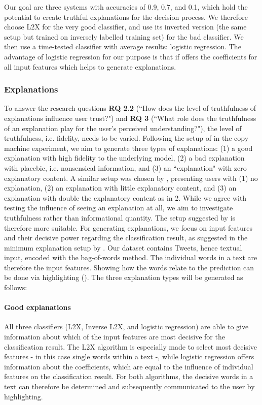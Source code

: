 Our goal are three systems with accuracies of 0.9, 0.7, and 0.1, which hold the potential to create truthful explanations for the decision process. We therefore choose L2X for the very good classifier, and use its inverted version (the same setup but trained on inversely labelled training set) for the bad classifier. We then use a time-tested classifier with average results: logistic regression. The advantage of logistic regression for our purpose is that if offers the coefficients for all input features which helps to generate explanations. 

\subsubsection{Explanations}
\label{subsubsec:method_explanations}
To answer the research questions \textbf{RQ 2.2} (``How does the level of truthfulness of explanations influence user trust?") and \textbf{RQ 3} (``What role does the truthfulness of an explanation play for the user's perceived understanding?"), the level of truthfulness, i.e. fidelity, needs to be varied. Following the setup of \cite{langer1978mindlessness} in the copy machine experiment, we aim to generate three types of explanations: (1) a good explanation with high fidelity to the underlying model, (2) a bad explanation with placebic, i.e. nonsensical information, and (3) an ``explanation" with zero explanatory content. A similar setup was chosen by \cite{ribeiro2018anchors}, presenting users with (1) no explanation, (2) an explanation with little explanatory content, and (3) an explanation with double the explanatory content as in 2. While we agree with testing the influence of seeing an explanation at all, we aim to investigate truthfulness rather than informational quantity. The setup suggested by \cite{langer1978mindlessness} is therefore more suitable.\newline
For generating explanations, we focus on input features and their decisive power regarding the classification result, as suggested in the minimum explanation setup by \cite{goodman16eu}. Our dataset contains Tweets, hence textual input, encoded with the bag-of-words method. The individual words in a text are therefore the input features. Showing how the words relate to the prediction can be done via highlighting (\cite{arras2017relevant, chen2012detecting, feng2018pathologies}).\newline
The three explanation types will be generated as follows:
\paragraph{Good explanations}
All three classifiers (L2X, Inverse L2X, and logistic regression) are able to give information about which of the input features are most decisive for the classification result. The L2X algorithm is especially made to select most decisive features - in this case single words within a text -, while logistic regression offers information about the coefficients, which are equal to the influence of individual features on the classification result. For both algorithms, the decisive words in a text can therefore be determined and subsequently communicated to the user by highlighting.
